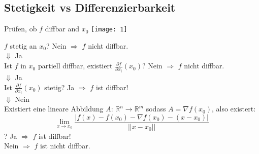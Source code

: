 
\subsection{Stetigkeit vs Differenzierbarkeit}


\begin{Rezept}{Prüfen, ob $f$ diffbar and $x_0$}{}
    \texttt{[image: 1]}
    
    $f$ stetig an $x_0$? Nein $\Rightarrow$ $f$ nicht diffbar.\\
	$\Downarrow$ Ja\\
	Ist $f$ in $x_0$ partiell diffbar, existiert $\frac{\partial f}{\partial x_i}(x_0)$? Nein $\Rightarrow$ $f$ nicht diffbar.\\
	$\Downarrow$ Ja\\
	Ist $\frac{\partial f}{\partial x_i}(x_0)$ stetig? Ja $\Rightarrow$ $f$ ist diffbar!\\
	$\Downarrow$ Nein\\
	Existiert eine lineare Abbildung $A$: $\mathbb{R}^n \rightarrow \mathbb{R}^m$ sodass $A=\nabla f(x_0)$, also existert:
	\[
    	\lim_{x\rightarrow x_0} \frac{|f(x)-f(x_0)-\nabla f(x_0) - (x-x_0)|}{||x-x_0||}
	\]?
	Ja $\Rightarrow$ $f$ ist diffbar!\\
	Nein $\Rightarrow$ $f$ ist nicht diffbar.
\end{Rezept}